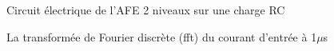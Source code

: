\begin{figure}[htb]
\caption{Circuit électrique de l'AFE 2 niveaux sur une charge RC}
\label{circuit_AFE_2L_RC}
\end{figure}


\begin{figure}[htb]
\caption{La transformée de Fourier discrète (fft) du courant d'entrée à 1$\mu$s}
\label{fft_RC}
\end{figure}



